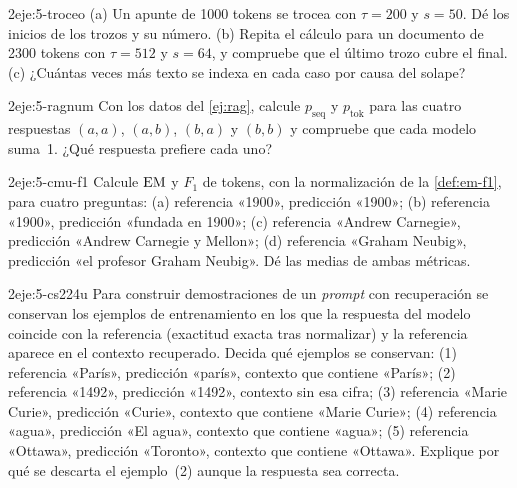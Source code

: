 \begin{ejercicio}{2}{eje:5-troceo}
(a) Un apunte de 1000 tokens se trocea con $\tau=200$ y $s=50$. Dé los inicios de los trozos y su número. (b) Repita el cálculo para un documento de 2300 tokens con $\tau=512$ y $s=64$, y compruebe que el último trozo cubre el final. (c) ¿Cuántas veces más texto se indexa en cada caso por causa del solape?
\end{ejercicio}

\begin{ejercicio}{2}{eje:5-ragnum}
Con los datos del \cref{ej:rag}, calcule $p_{\mathrm{seq}}$ y $p_{\mathrm{tok}}$ para las cuatro respuestas $(a,a)$, $(a,b)$, $(b,a)$ y $(b,b)$ y compruebe que cada modelo suma~1. ¿Qué respuesta prefiere cada uno?
\end{ejercicio}

\begin{ejercicio}{2}{eje:5-cmu-f1}
Calcule $\operatorname{EM}$ y $F_1$ de tokens, con la normalización de la \cref{def:em-f1}, para cuatro preguntas: (a) referencia «1900», predicción «1900»; (b) referencia «1900», predicción «fundada en 1900»; (c) referencia «Andrew Carnegie», predicción «Andrew Carnegie y Mellon»; (d) referencia «Graham Neubig», predicción «el profesor Graham Neubig». Dé las medias de ambas métricas.
\end{ejercicio}

\begin{ejercicio}{2}{eje:5-cs224u}
Para construir demostraciones de un \emph{prompt} con recuperación se conservan los ejemplos de entrenamiento en los que la respuesta del modelo coincide con la referencia (exactitud exacta tras normalizar) y la referencia aparece en el contexto recuperado. Decida qué ejemplos se conservan: (1) referencia «París», predicción «parís», contexto que contiene «París»; (2) referencia «1492», predicción «1492», contexto sin esa cifra; (3) referencia «Marie Curie», predicción «Curie», contexto que contiene «Marie Curie»; (4) referencia «agua», predicción «El agua», contexto que contiene «agua»; (5) referencia «Ottawa», predicción «Toronto», contexto que contiene «Ottawa». Explique por qué se descarta el ejemplo~(2) aunque la respuesta sea correcta.
\end{ejercicio}

